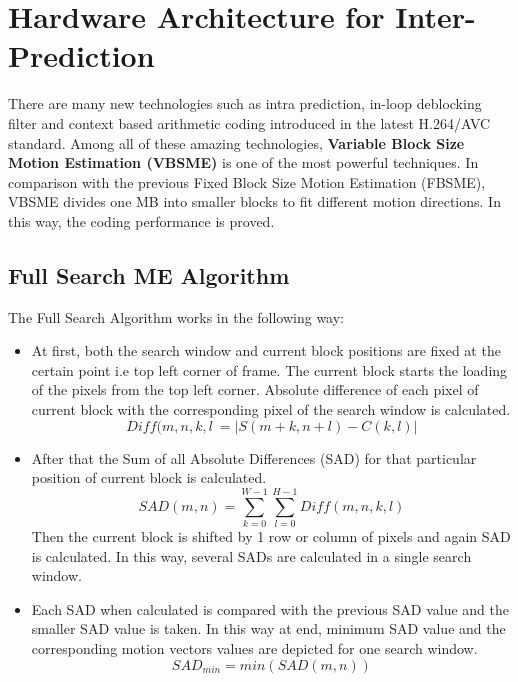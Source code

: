
\chapter{Hardware Architecture for Inter-Prediction} %
\label{Chapter4}

There are many new technologies such as intra prediction, in-loop deblocking filter and context based arithmetic coding introduced in the latest H.264/AVC standard. Among all of these amazing technologies, \textbf{Variable Block Size Motion Estimation (VBSME)} is one of the most powerful techniques. In comparison with the previous Fixed Block Size Motion Estimation (FBSME), VBSME divides one MB into smaller blocks to fit different motion directions. In this way, the coding performance is proved.

\section{Full Search ME Algorithm}
The Full Search Algorithm works in the following way:
\begin{itemize}
	\item At first, both the search window and current block positions are fixed at the certain point i.e top left corner of frame. The current block starts the loading of the pixels from the top left corner. Absolute difference of each pixel of current block with the corresponding pixel of the search window is calculated.
	\begin{equation} \label{equ:1}
		Diff(m,n,k,l\ = |S(m+k, n+l) - C(k,l)|
	\end{equation}
	\item After that the Sum of all Absolute Differences (SAD) for that particular position of current block is calculated.
	\begin{equation} \label{equ:2}
		SAD(m,n) = \sum_{k=0}^{W-1}\sum_{l=0}^{H-1}Diff(m,n,k,l) 
	\end{equation}
	Then the current block is shifted by 1 row or column of pixels and again SAD is calculated. In this way, several SADs are calculated in a single search window.
	\item Each SAD when calculated is compared with the previous SAD value and the smaller SAD value is taken. In this way at end, minimum SAD value and the corresponding motion vectors values are depicted for one search window. 
	\begin{equation} \label{equ:3}
		SAD_{min} = min(SAD(m,n))
	\end{equation}
\end{itemize}

